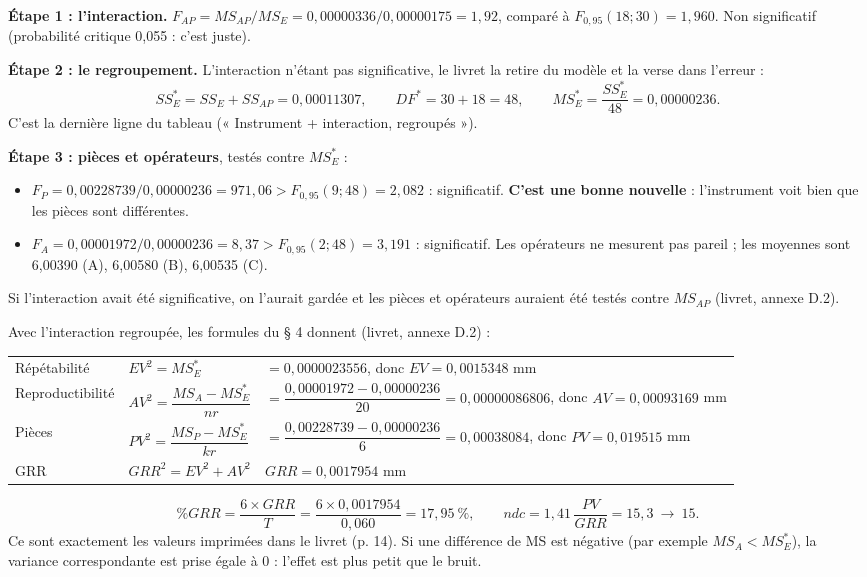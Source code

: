 \documentclass[10pt,a4paper]{article}
\begin{document}
\textbf{Étape 1 : l'interaction.} $F_{AP}=MS_{AP}/MS_E = 0{,}00000336/0{,}00000175 = 1{,}92$, comparé à $F_{0{,}95}(18 ; 30) = 1{,}960$. Non significatif (probabilité critique 0,055 : c'est juste).

\textbf{Étape 2 : le regroupement.} L'interaction n'étant pas significative, le livret la retire du modèle et la verse dans l'erreur :
\[SS_E^*=SS_E+SS_{AP}=0{,}00011307,\qquad DF^*=30+18=48,\qquad MS_E^*=\frac{SS_E^*}{48}=0{,}00000236.\]
C'est la dernière ligne du tableau (« Instrument + interaction, regroupés »).

\textbf{Étape 3 : pièces et opérateurs}, testés contre $MS_E^*$ :
\begin{itemize}
\item $F_P = 0{,}00228739/0{,}00000236 = 971{,}06 > F_{0{,}95}(9 ; 48) = 2{,}082$ : significatif. \textbf{C'est une bonne nouvelle} : l'instrument voit bien que les pièces sont différentes.
\item $F_A = 0{,}00001972/0{,}00000236 = 8{,}37 > F_{0{,}95}(2 ; 48) = 3{,}191$ : significatif. Les opérateurs ne mesurent pas pareil ; les moyennes sont 6,00390 (A), 6,00580 (B), 6,00535 (C).
\end{itemize}
{\small Si l'interaction avait été significative, on l'aurait gardée et les pièces et opérateurs auraient été testés contre $MS_{AP}$ (livret, annexe D.2).}

Avec l'interaction regroupée, les formules du § 4 donnent (livret, annexe D.2) :

\renewcommand{\arraystretch}{1.3}
\begin{tabularx}{\linewidth}{@{}l l X@{}}
\toprule
Répétabilité & $EV^2 = MS_E^*$ & $= 0{,}0000023556$, donc $EV = 0{,}0015348$ mm\\
Reproductibilité & $AV^2 = \dfrac{MS_A - MS_E^*}{nr}$ & $= \dfrac{0{,}00001972-0{,}00000236}{20}=0{,}00000086806$, donc $AV = 0{,}00093169$ mm\\
Pièces & $PV^2 = \dfrac{MS_P - MS_E^*}{kr}$ & $= \dfrac{0{,}00228739-0{,}00000236}{6}=0{,}00038084$, donc $PV = 0{,}019515$ mm\\
GRR & $GRR^2 = EV^2 + AV^2$ & $GRR = 0{,}0017954$ mm\\
\bottomrule
\end{tabularx}
\[\%GRR=\frac{6\times GRR}{T}=\frac{6\times0{,}0017954}{0{,}060}=17{,}95\ \%,\qquad ndc=1{,}41\,\frac{PV}{GRR}=15{,}3\ \to\ 15.\]
Ce sont exactement les valeurs imprimées dans le livret (p. 14). Si une différence de MS est négative (par exemple $MS_A < MS_E^*$), la variance correspondante est prise égale à 0 : l'effet est plus petit que le bruit.
\end{document}
